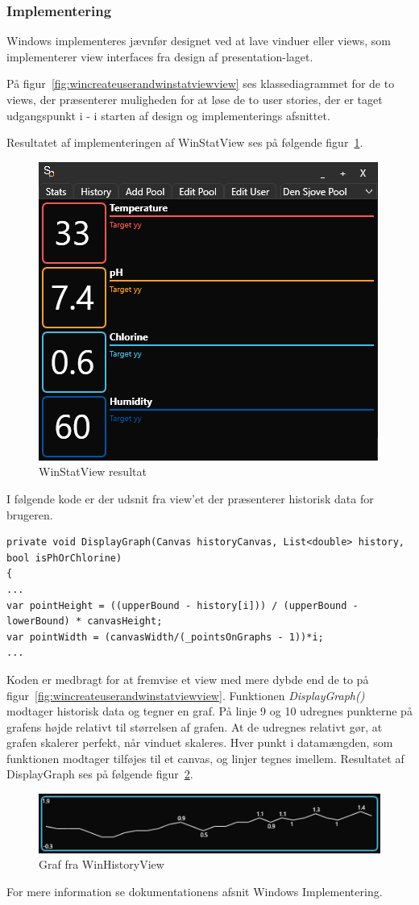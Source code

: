 \subsubsection{Implementering}
Windows implementeres jævnfør designet ved at lave vinduer eller views, som implementerer view interfaces fra design af presentation-laget.

På figur~\ref{fig:wincreateuserandwinstatviewview} ses klassediagrammet for de to views, der præsenterer muligheden for at løse de to user stories, der er taget udgangspunkt i - i starten af design og implementerings afsnittet.

Resultatet af implementeringen af WinStatView ses på følgende figur~\ref{fig:winstatview}.

\begin{figure}
\centering
\includegraphics[width=0.5\linewidth]{figs/implementering/winstatview}
\caption{WinStatView resultat}
\label{fig:winstatview}
\end{figure}

I følgende kode er der udsnit fra view'et der præsenterer historisk data for brugeren. 

\begin{lstlisting}[caption=DisplayGraph, label=DisplayGraph]
private void DisplayGraph(Canvas historyCanvas, List<double> history, bool isPhOrChlorine)
{
...
var pointHeight = ((upperBound - history[i])) / (upperBound - lowerBound) * canvasHeight;
var pointWidth = (canvasWidth/(_pointsOnGraphs - 1))*i;
...
\end{lstlisting}

Koden er medbragt for at fremvise et view med mere dybde end de to på figur~\ref{fig:wincreateuserandwinstatviewview}.
Funktionen \textit{DisplayGraph()} modtager historisk data og tegner en graf. 
På linje 9 og 10 udregnes punkterne på grafens højde relativt til størrelsen af grafen. At de udregnes relativt gør, at grafen skalerer perfekt, når vinduet skaleres. 
Hver punkt i datamængden, som funktionen modtager tilføjes til et canvas, og linjer tegnes imellem. Resultatet af DisplayGraph ses på følgende figur~\ref{fig:displaygraph}.

\begin{figure}
\centering
\includegraphics[width=0.5\linewidth]{figs/implementering/displaygraph}
\caption{Graf fra WinHistoryView}
\label{fig:displaygraph}
\end{figure}

For mere information se dokumentationens afsnit Windows Implementering.